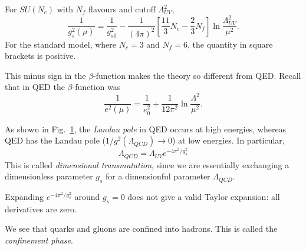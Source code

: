 For $SU(N_c)$ with $N_f$ flavours and cutoff $\Lambda^2_{UV}$, 
\begin{equation}
  \frac{1}{g^2_s(\mu)} = \frac{1}{g^2_{s 0}} - \frac{1}{(4 \pi)^2} \left[ \frac{11}{3} N_c - \frac{2}{3} N_f \right] \ln \frac{\Lambda^2_{UV}}{\mu^2}.
\end{equation}
For the standard model, where $N_c = 3$ and $N_f = 6$, the quantity in square brackets is positive.

This minus sign in the $\beta$-function makes the theory so different from QED.
Recall that in QED the $\beta$-function was
\begin{equation}
  \frac{1}{e^2(\mu)} = \frac{1}{e^2_0} + \frac{1}{12 \pi^2} \ln \frac{\Lambda^2}{\mu^2}.
\end{equation}

\begin{figure}[tbhp]
  \centering
  \caption{}
  \label{fig:l22f1}
\end{figure}
As shown in Fig.~\ref{fig:l22f1}, the \emph{Landau pole} in QED occurs at high energies, whereas QED has the Landau pole ($1 / g^2 (\Lambda_{QCD}) \to 0$) at low energies.
In particular, 
\begin{equation}
  \boxed{\Lambda_{QCD} = \Lambda_{UV} e^{-4 \pi^2 / g_s^2}}
\end{equation}
This is called \emph{dimensional transmutation}, since we are essentially exchanging a dimensionless parameter $g_s$ for a dimensionful parameter $\Lambda_{QCD}$.
\begin{remark}
  Expanding $e^{-4 \pi ^2 / g^2_s}$ around $g_s = 0$ does not give a valid Taylor expansion: all derivatives are zero.
\end{remark}

We see that quarks and gluons are confined into hadrons. This is called the \emph{confinement phase}.
